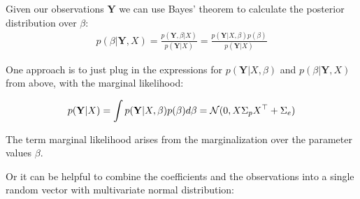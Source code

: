 Given our observations $\mathbf{Y}$  we can use Bayes' theorem to calculate the posterior distribution over $\beta$:
\begin{gather*}
    p(\beta| \mathbf{Y}, X) = \frac{p(\mathbf{Y},\beta|X)}{p(\mathbf{Y}|X)} =
    \frac{p(\mathbf{Y}|X,\beta)p(\beta)}{p(\mathbf{Y}|X)}
\end{gather*}

One approach is to just plug in the expressions for
$p(\mathbf{Y}|X,\beta)$ and $p(\beta|\mathbf{Y}, X)$ from above, with the marginal likelihood:

\begin{gather}\label{eq:marginal-likelihood}
    p(\mathbf{Y}|X) = \int p(\mathbf{Y}|X,\beta) p(\beta) d\beta = \operatorname{\mathcal{N}}(0, X \Sigma_p X^{\top} + \Sigma_e)
\end{gather}

The term marginal likelihood arises from the marginalization over the parameter values $\beta$.

Or it can be helpful to combine the coefficients and the observations into a single random vector with
multivariate normal distribution:

